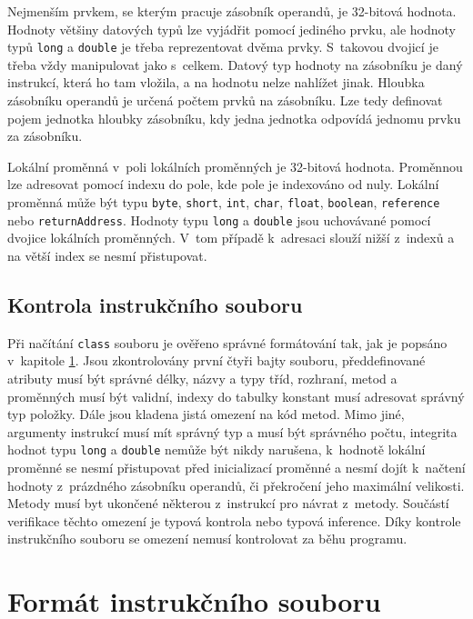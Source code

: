 Nejmenším prvkem, se kterým pracuje zásobník operandů, je 32-bitová hodnota. Hodnoty většiny datových typů lze vyjádřit pomocí jediného prvku, ale hodnoty typů \texttt{long} a \texttt{double} je třeba reprezentovat dvěma prvky. S~takovou dvojicí je třeba vždy manipulovat jako s~celkem. Datový typ hodnoty na zásobníku je daný instrukcí, která ho tam vložila, a na hodnotu nelze nahlížet jinak. Hloubka zásobníku operandů je určená počtem prvků na zásobníku. Lze tedy definovat pojem jednotka hloubky zásobníku, kdy jedna jednotka odpovídá jednomu prvku za zásobníku.

Lokální proměnná v~poli lokálních proměnných je 32-bitová hodnota. Proměnnou lze adresovat pomocí indexu do pole, kde pole je indexováno od nuly. Lokální proměnná může být typu \texttt{byte}, \texttt{short}, \texttt{int}, \texttt{char}, \texttt{float}, \texttt{boolean}, \texttt{reference} nebo \texttt{returnAddress}. Hodnoty typu \texttt{long} a \texttt{double} jsou uchovávané pomocí dvojice lokálních proměnných. V~tom případě k~adresaci slouží nižší z~indexů a na větší index se nesmí přistupovat. 


\subsection{Kontrola instrukčního souboru}

Při načítání \texttt{class} souboru je ověřeno správné formátování tak, jak je popsáno v~kapitole \ref{Bytecode:Format}. Jsou zkontrolovány první čtyři bajty souboru, předdefinované atributy musí být správné délky, názvy a typy tříd, rozhraní, metod a proměnných musí být validní, indexy do tabulky konstant musí adresovat správný typ položky. Dále jsou kladena jistá omezení na kód metod. Mimo jiné, argumenty instrukcí musí mít správný typ a musí být správného počtu, integrita hodnot typu \texttt{long} a \texttt{double} nemůže být nikdy narušena, k~hodnotě lokální proměnné se nesmí přistupovat před inicializací proměnné a nesmí dojít k~načtení hodnoty z~prázdného zásobníku operandů, či překročení jeho maximální velikosti. Metody musí byt ukončené některou z~instrukcí pro návrat z~metody. Součástí verifikace těchto omezení je typová kontrola nebo typová inference. Díky kontrole instrukčního souboru se omezení nemusí kontrolovat za běhu programu.


\section{Formát instrukčního souboru}\label{Bytecode:Format}

